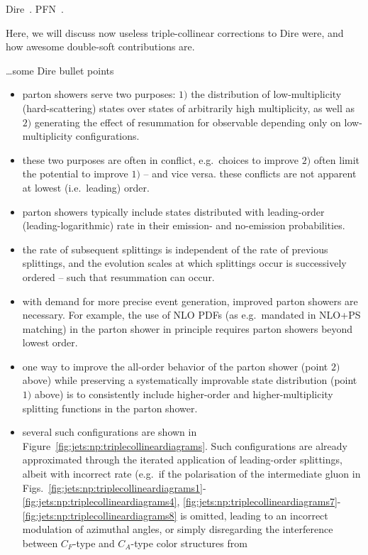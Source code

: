 
Dire~\cite{Hoche:2015sya}.  PFN~\cite{Komiske:2018cqr}.

Here, we will discuss now useless triple-collinear corrections to Dire were, and
how awesome double-soft contributions are.

\dots some Dire bullet points
\begin{itemize}
\item parton showers serve two purposes: $1)$ the distribution of low-multiplicity
(hard-scattering) states over states of arbitrarily high multiplicity, as well
as $2)$ generating the effect of resummation for observable depending only on 
low-multiplicity configurations.
\item these two purposes are often in conflict, e.g.\ choices to improve
$2)$ often limit the potential to improve $1)$ -- and vice versa. these
conflicts are not apparent at lowest (i.e.\ leading) order.
\item parton showers typically include states distributed with leading-order 
(leading-logarithmic) rate in their emission- and no-emission probabilities.
\item the rate of subsequent splittings is independent of the rate of
previous splittings, and the evolution scales at which splittings occur is
successively ordered -- such that resummation can occur.
\item with demand for more precise event generation, improved parton showers
are necessary. For example, the use of NLO PDFs (as e.g.\ mandated in NLO+PS
matching) in the parton shower in principle requires parton showers beyond
lowest order.
\item one way to improve the all-order behavior of the parton shower (point $2)$ 
above) while preserving a systematically improvable state distribution (point $1)$ 
above) is to consistently include higher-order and higher-multiplicity 
splitting functions in the parton shower.
\item several such configurations are shown in 
Figure~\ref{fig:jets:np:triplecollineardiagrams}. Such configurations are
already approximated through the iterated application of leading-order
splittings, albeit with incorrect rate (e.g.\ if the polarisation of 
the intermediate gluon in 
Figs.~\ref{fig:jets:np:triplecollineardiagrams1}-\ref{fig:jets:np:triplecollineardiagrams4},
\ref{fig:jets:np:triplecollineardiagrams7}-\ref{fig:jets:np:triplecollineardiagrams8}
is omitted, leading to an incorrect modulation of azimuthal angles,
or simply disregarding the interference between
$C_F$-type and $C_A$-type color structures from 

\end{itemize}
